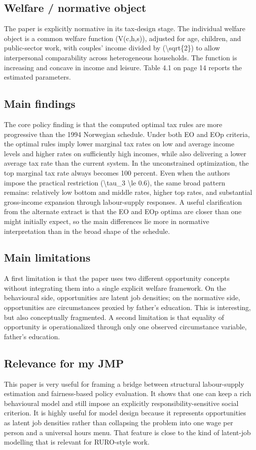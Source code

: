 \documentclass[11pt,a4paper]{article}
\begin{document}
\subsection*{Welfare / normative object}
The paper is explicitly normative in its tax-design stage. The individual welfare object is a common welfare function (V(c,h,s)), adjusted for age, children, and public-sector work, with couples’ income divided by (\textbackslash{}sqrt\{2\}) to allow interpersonal comparability across heterogeneous households. The function is increasing and concave in income and leisure. Table 4.1 on page 14 reports the estimated parameters.

\subsection*{Main findings}
The core policy finding is that the computed optimal tax rules are more progressive than the 1994 Norwegian schedule. Under both EO and EOp criteria, the optimal rules imply lower marginal tax rates on low and average income levels and higher rates on sufficiently high incomes, while also delivering a lower average tax rate than the current system. In the unconstrained optimization, the top marginal tax rate always becomes 100 percent. Even when the authors impose the practical restriction (\textbackslash{}tau\_3 \textbackslash{}le 0.6), the same broad pattern remains: relatively low bottom and middle rates, higher top rates, and substantial gross-income expansion through labour-supply responses. A useful clarification from the alternate extract is that the EO and EOp optima are closer than one might initially expect, so the main differences lie more in normative interpretation than in the broad shape of the schedule.

\subsection*{Main limitations}
A first limitation is that the paper uses two different opportunity concepts without integrating them into a single explicit welfare framework. On the behavioural side, opportunities are latent job densities; on the normative side, opportunities are circumstances proxied by father’s education. This is interesting, but also conceptually fragmented. A second limitation is that equality of opportunity is operationalized through only one observed circumstance variable, father’s education.

\subsection*{Relevance for my JMP}
This paper is very useful for framing a bridge between structural labour-supply estimation and fairness-based policy evaluation. It shows that one can keep a rich behavioural model and still impose an explicitly responsibility-sensitive social criterion. It is highly useful for model design because it represents opportunities as latent job densities rather than collapsing the problem into one wage per person and a universal hours menu. That feature is close to the kind of latent-job modelling that is relevant for RURO-style work.
\end{document}

